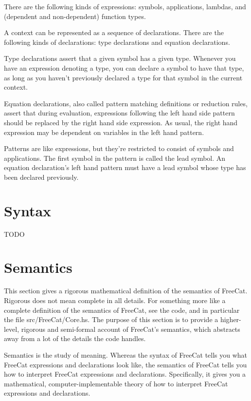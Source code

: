 \documentclass{article}
\begin{document}
There are the following kinds of expressions: symbols, applications, lambdas, and (dependent and non-dependent) function types.

A context can be represented as a sequence of declarations. There are the following kinds of declarations: type declarations and equation declarations.

Type declarations assert that a given symbol has a given type. Whenever you have an expression denoting a type, you can declare a symbol to have that type, as long as you haven't previously declared a type for that symbol in the current context.

Equation declarations, also called pattern matching definitions or reduction rules, assert that during evaluation, expressions following the left hand side pattern should be replaced by the right hand side expression. As usual, the right hand expression may be dependent on variables in the left hand pattern.

Patterns are like expressions, but they're restricted to consist of symbols and applications. The first symbol in the pattern is called the lead symbol. An equation declaration's left hand pattern must have a lead symbol whose type has been declared previously.

\section{Syntax}

TODO

\section{Semantics}

This section gives a rigorous mathematical definition of the semantics of FreeCat. Rigorous does not mean complete in all details. For something more like a complete definition of the semantics of FreeCat, see the code, and in particular the file src/FreeCat/Core.hs. The purpose of this section is to provide a higher-level, rigorous and semi-formal account of FreeCat's semantics, which abstracts away from a lot of the details the code handles.

Semantics is the study of meaning. Whereas the syntax of FreeCat tells you what FreeCat expressions and declarations look like, the semantics of FreeCat tells you how to interpret FreeCat expressions and declarations. Specifically, it gives you a mathematical, computer-implementable theory of how to interpret FreeCat expressions and declarations.
\end{document}
